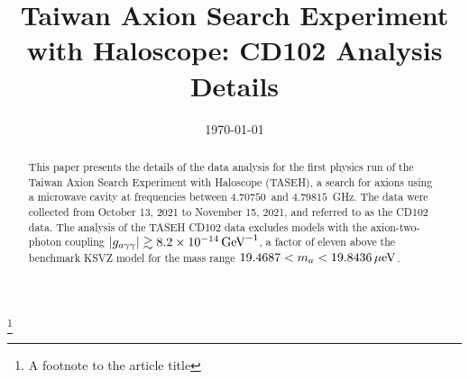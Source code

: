 \documentclass[%
preprint, %
 amsmath,amssymb,
 aps,
]{revtex4-2}
\newcommand{\gagg}{\ensuremath{\left|g_{a\gamma\gamma}\right|}}
\newcommand{\ma}{\ensuremath{m_a}}
\newcommand{\muevcc}{\ensuremath{\,\mu\text{e\hspace{-.08em}V}}}
\newcommand{\GeVinv}{\ensuremath{\,\text{Ge\hspace{-.08em}V}^{-1}}}
\newcommand{\flo}{\ensuremath{4.70750}}
\newcommand{\fhi}{\ensuremath{4.79815}}
\newcommand{\mlo}{\ensuremath{19.4687}}
\newcommand{\mhi}{\ensuremath{19.8436}}
\newcommand{\avelimit}{\ensuremath{8.2\times 10^{-14}}} %
\begin{document}

\title{Taiwan Axion Search Experiment with Haloscope: CD102 Analysis Details}%
\thanks{A footnote to the article title}%



\date{\today}%

\begin{abstract}

This paper presents the details of the data analysis for the first physics 
run of the Taiwan Axion Search Experiment with Haloscope (TASEH), 
a search for axions 
using a microwave cavity at frequencies between \flo\ and \fhi~GHz. 
The data were collected from October 13, 2021 to November 15, 2021, and 
referred to as the CD102 data. The analysis of the TASEH CD102 data excludes 
models with the axion-two-photon coupling 
$\gagg\gtrsim \avelimit\GeVinv$, a factor of eleven above the benchmark 
KSVZ model for the mass range $\mlo < \ma < \mhi \muevcc$. 


\end{abstract}
\end{document}
